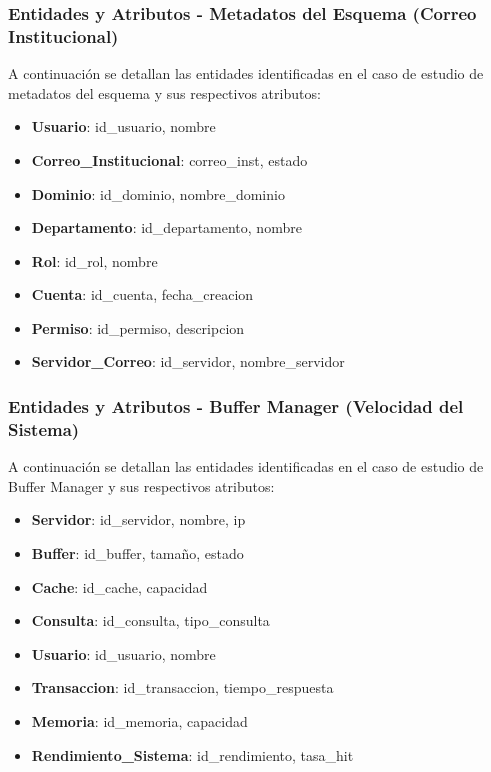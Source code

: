 \documentclass{article}
\begin{document}
\subsubsection{Entidades y Atributos - Metadatos del Esquema (Correo Institucional)}

A continuación se detallan las entidades identificadas en el caso de estudio de metadatos del esquema y sus respectivos atributos:

\begin{itemize}
    \item \textbf{Usuario}: id\_usuario, nombre
    \item \textbf{Correo\_Institucional}: correo\_inst, estado
    \item \textbf{Dominio}: id\_dominio, nombre\_dominio
    \item \textbf{Departamento}: id\_departamento, nombre
    \item \textbf{Rol}: id\_rol, nombre
    \item \textbf{Cuenta}: id\_cuenta, fecha\_creacion
    \item \textbf{Permiso}: id\_permiso, descripcion
    \item \textbf{Servidor\_Correo}: id\_servidor, nombre\_servidor
\end{itemize}

\subsubsection{Entidades y Atributos - Buffer Manager (Velocidad del Sistema)}

A continuación se detallan las entidades identificadas en el caso de estudio de Buffer Manager y sus respectivos atributos:

\begin{itemize}
    \item \textbf{Servidor}: id\_servidor, nombre, ip
    \item \textbf{Buffer}: id\_buffer, tamaño, estado
    \item \textbf{Cache}: id\_cache, capacidad
    \item \textbf{Consulta}: id\_consulta, tipo\_consulta
    \item \textbf{Usuario}: id\_usuario, nombre
    \item \textbf{Transaccion}: id\_transaccion, tiempo\_respuesta
    \item \textbf{Memoria}: id\_memoria, capacidad
    \item \textbf{Rendimiento\_Sistema}: id\_rendimiento, tasa\_hit
\end{itemize}
\end{document}
